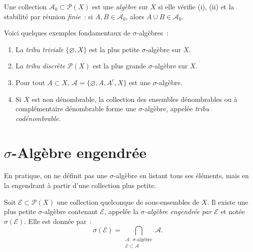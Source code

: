 \begin{definition}
Une collection $\mathcal{A}_0 \subset \mathcal{P}(X)$ est une \emph{alg\`ebre} sur
$X$ si elle v\'erifie (i), (ii) et la stabilit\'e par r\'eunion \emph{finie}~:
si $A, B \in \mathcal{A}_0$, alors $A \cup B \in \mathcal{A}_0$.
\end{definition}

\begin{exemple}
Voici quelques exemples fondamentaux de $\sigma$-alg\`ebres~:
\begin{enumerate}
    \item La \emph{tribu triviale} $\{\varnothing, X\}$ est la plus petite
    $\sigma$-alg\`ebre sur $X$.
    \item La \emph{tribu discr\`ete} $\mathcal{P}(X)$ est la plus grande
    $\sigma$-alg\`ebre sur $X$.
    \item Pour tout $A \subset X$, $\mathcal{A} = \{\varnothing, A, A^c, X\}$ est
    une $\sigma$-alg\`ebre.
    \item Si $X$ est non d\'enombrable, la collection des ensembles d\'enombrables
    ou \`a compl\'ementaire d\'enombrable forme une $\sigma$-alg\`ebre, appel\'ee
    \emph{tribu codénombrable}.
\end{enumerate}
\end{exemple}

\section{$\sigma$-Alg\`ebre engendr\'ee}

En pratique, on ne d\'efinit pas une $\sigma$-alg\`ebre en listant tous ses
\'el\'ements, mais en la \og engendrant \fg \`a partir d'une collection plus petite.

\begin{theoreme}
\label{thm:sigma_engendree}
Soit $\mathcal{E} \subset \mathcal{P}(X)$ une collection quelconque de
sous-ensembles de $X$. Il existe une plus petite $\sigma$-alg\`ebre contenant
$\mathcal{E}$, appel\'ee la \emph{$\sigma$-alg\`ebre engendr\'ee par $\mathcal{E}$}
et not\'ee $\sigma(\mathcal{E})$. Elle est donn\'ee par~:
\[
\sigma(\mathcal{E}) = \bigcap_{\substack{\mathcal{A} \text{ $\sigma$-alg\`ebre} \\
\mathcal{E} \subset \mathcal{A}}} \mathcal{A}.
\]
\end{theoreme}

